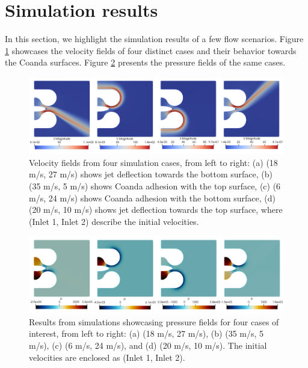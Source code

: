 \section{Simulation results}
In this section, we highlight the simulation results of a few flow scenarios.
 Figure \ref{vel} showcases the velocity fields of four distinct cases and their behavior towards the Coanda surfaces. Figure \ref{pres} presents the pressure fields of the same cases. 
\begin{figure}[ht]
  \centering
  \includegraphics[width=15.5cm]{images/Theory-CFD/cfdvel.png}
  \caption{Velocity fields from four simulation cases, from left to right: (a) (18 m/s, 27 m/s) shows jet deflection towards the bottom surface, (b) (35 m/s, 5 m/s) shows Coanda adhesion with the top surface, (c) (6 m/s, 24 m/s) shows Coanda adhesion with the bottom surface, (d) (20 m/s, 10 m/s) shows jet deflection towards the top surface, where (Inlet 1, Inlet 2) describe the initial velocities.}
  \label{vel}
\end{figure}
\begin{figure}[ht]
  \centering
  \includegraphics[width=15.5cm]{images/Theory-CFD/cfdp.png}
  \caption{Results from simulations showcasing pressure fields for four cases of interest, from left to right: (a) (18 m/s, 27 m/s), (b) (35 m/s, 5 m/s), (c) (6 m/s, 24 m/s), and (d) (20 m/s, 10 m/s).  The initial velocities are enclosed as (Inlet 1, Inlet 2).}
  \label{pres}
\end{figure}